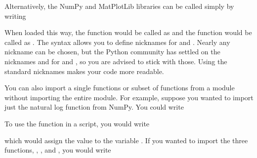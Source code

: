 \documentclass[letterpaper,10pt,english]{sphinxmanual}
\begin{document}
\sphinxAtStartPar
Alternatively, the NumPy and MatPlotLib libraries can be called simply by writing

\begin{sphinxVerbatim}[commandchars=\\\{\}]
 
 
\end{sphinxVerbatim}

\sphinxAtStartPar
When loaded this way, the  function would be called as  and the  function would be called as .  The  syntax allows you to define nicknames for  and .  Nearly any nickname can be chosen, but the Python community has settled on the nicknames  and  for  and , so you are advised to stick with those.  Using the standard nicknames makes your code more readable.

\sphinxAtStartPar
You can also import a single functions or subset of functions from a module without importing the entire module.  For example, suppose you wanted to import just the natural log function  from NumPy.  You could write

\begin{sphinxVerbatim}[commandchars=\\\{\}]
   
\end{sphinxVerbatim}

\sphinxAtStartPar
To use the  function in a script, you would write

\begin{sphinxVerbatim}[commandchars=\\\{\}]
  
\end{sphinxVerbatim}

\sphinxAtStartPar
which would assign the value  to the variable .  If you wanted to import the three functions, , , and , you would write
\end{document}
